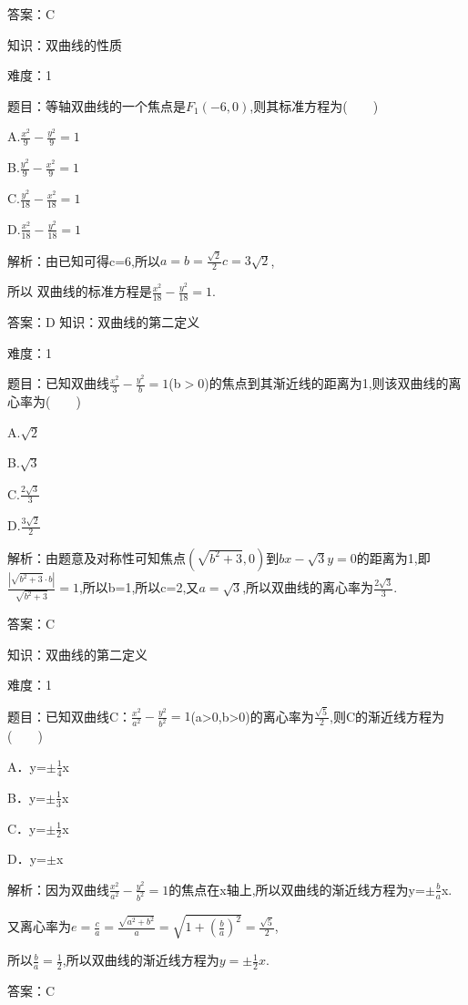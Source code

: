 \documentclass{article} %
\begin{document}
答案：C

知识：双曲线的性质

难度：1

题目：等轴双曲线的一个焦点是$F_{1}(-6,0)$,则其标准方程为(　　)

A.$\frac{x^2}{9}-\frac{y^2}{9}=1$   

B.$\frac{y^2}{9}-\frac{x^2}{9}=1$

C.$\frac{y^2}{18}-\frac{x^2}{18}=1$   

D.$\frac{x^2}{18}-\frac{y^2}{18}=1$

解析：由已知可得c=6,所以$a=b=\frac{\sqrt{2}}{2}c=3\sqrt{2}$,

所以 双曲线的标准方程是$\frac{x^2}{18}-\frac{y^2}{18}=1$.

答案：D
知识：双曲线的第二定义

难度：1

题目：已知双曲线$\frac{x^2}{3}-\frac{y^2}{b}=1$(b${>}$0)的焦点到其渐近线的距离为1,则该双曲线的离心率为(　　)

A.$\sqrt{2}$  

B.$\sqrt{3}$

C.$\frac{2\sqrt{3}}{3}$

D.$\frac{3\sqrt{2}}{2}$

解析：由题意及对称性可知焦点$(\sqrt{b^2+3},0)$到$bx-\sqrt{3}y=0$的距离为1,即$\frac{|\sqrt{b^2+3}\cdot b|}{\sqrt{b^2+3}}=1$,所以b=1,所以c=2,又$a=\sqrt{3}$,所以双曲线的离心率为$\frac{2\sqrt{3}}{3}$.

答案：C



知识：双曲线的第二定义

难度：1

题目：已知双曲线C：$\frac{x^2}{a^2}-\frac{y^2}{b^2}=1$(a>0,b>0)的离心率为$\frac{\sqrt{5}}{2}$,则C的渐近线方程为(　　)

A．y=${\pm}\frac{1}{4}$x   

B．y=${\pm}\frac{1}{3}$x

C．y=${\pm}\frac{1}{2}$x   

D．y=${\pm}$x

解析：因为双曲线$\frac{x^2}{a^2}-\frac{y^2}{b^2}=1$的焦点在x轴上,所以双曲线的渐近线方程为y=${\pm}\frac{b}{a}$x.

又离心率为$e=\frac{c}{a}=\frac{\sqrt{a^2+b^2}}{a}=\sqrt{1+(\frac{b}{a})^2}=\frac{\sqrt{5}}{2}$,

所以$\frac{b}{a}=\frac{1}{2}$,所以双曲线的渐近线方程为$y={\pm} \frac{1}{2}x$.

答案：C
\end{document}

